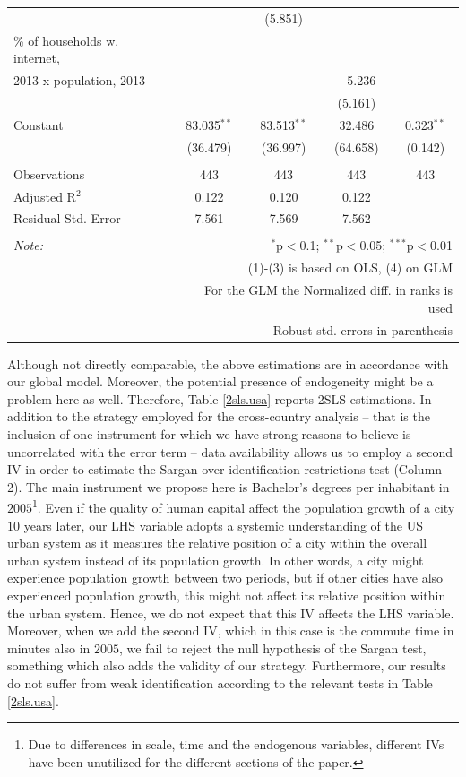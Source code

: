 \documentclass[10pt,letterpaper]{article}
\begin{document}
\begin{table}[!htbp]
\begin{tabular}{@{\extracolsep{1pt}}lcccc}
  &  & (5.851) &  &  \\ 
  \% of households w. internet, \\
                             2013 x population, 2013 &  &  & $-$5.236 &  \\ 
  &  &  & (5.161) &  \\ 
  Constant & 83.035$^{**}$ & 83.513$^{**}$ & 32.486 & 0.323$^{**}$ \\ 
  & (36.479) & (36.997) & (64.658) & (0.142) \\ 
 \hline \\[-1.8ex] 
Observations & 443 & 443 & 443 & 443 \\ 
Adjusted R$^{2}$ & 0.122 & 0.120 & 0.122 &  \\ 
Residual Std. Error & 7.561 & 7.569 & 7.562 &  \\ 
\hline 
\hline \\[-1.8ex] 
\textit{Note:}  & \multicolumn{4}{r}{$^{*}$p$<$0.1; $^{**}$p$<$0.05; $^{***}$p$<$0.01} \\ 
 & \multicolumn{4}{r}{(1)-(3) is based on OLS, (4) on GLM} \\ 
 & \multicolumn{4}{r}{For the GLM the Normalized diff. in ranks is used} \\ 
 & \multicolumn{4}{r}{Robust std. errors in parenthesis} \\ 
\end{tabular} 
\end{table}

Although not directly comparable, the above estimations are in
accordance with our global model. Moreover, the potential presence of
endogeneity might be a problem here as well. Therefore, Table
\ref{2sls.usa} reports 2SLS estimations. In addition to the strategy
employed for the cross-country analysis -- that is the inclusion of one
instrument for which we have strong reasons to believe is uncorrelated
with the error term -- data availability allows us to employ a second IV
in order to estimate the Sargan over-identification restrictions test
(Column 2). The main instrument we propose here is Bachelor's degrees
per inhabitant in \(2005\)\footnote{\color{blue} Due to differences in
  scale, time and the endogenous variables, different IVs have been
  unutilized for the different sections of the paper. \color{black}}.
Even if the quality of human capital affect the population growth of a
city \(10\) years later, our LHS variable adopts a systemic
understanding of the US urban system as it measures the relative
position of a city within the overall urban system instead of its
population growth. In other words, a city might experience population
growth between two periods, but if other cities have also experienced
population growth, this might not affect its relative position within
the urban system. Hence, we do not expect that this IV affects the LHS
variable. Moreover, when we add the second IV, which in this case is the
commute time in minutes also in \(2005\), we fail to reject the null
hypothesis of the Sargan test, something which also adds the validity of
our strategy. Furthermore, our results do not suffer from weak
identification according to the relevant tests in Table \ref{2sls.usa}.
\end{document}
